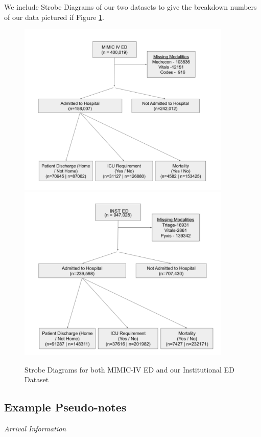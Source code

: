 \documentclass[pmlr]{jmlr}%
\begin{document}
{We include Strobe Diagrams of our two datasets to give the breakdown numbers of our data pictured if Figure \ref{strobe}.

 \begin{figure}[b!]
   \centering 
   \includegraphics[width=4in]{strobe1.png} 
   \includegraphics[width=4in]{strobe2.png} 
   \caption{Strobe Diagrams for both MIMIC-IV ED and our Institutional ED Dataset}
   \label{strobe} 
 \end{figure} 

\subsection{Example Pseudo-notes}
\label{exnotes}
\begin{multicols}{2}

\noindent\textit{Arrival Information}\\


\end{multicols}}
\end{document}

